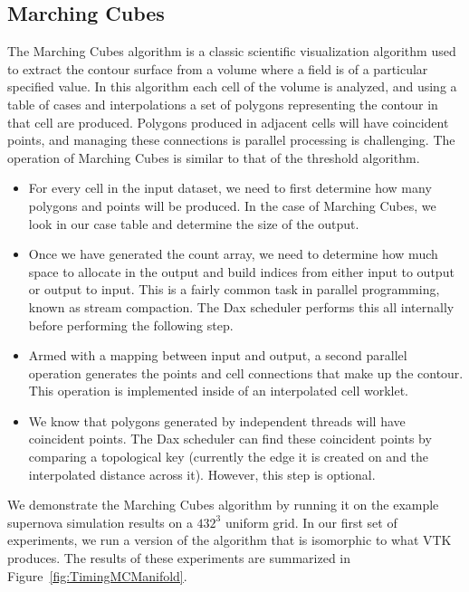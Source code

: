 \subsection{Marching Cubes}

The Marching Cubes algorithm is a classic scientific
visualization algorithm used to extract the contour surface from a volume
where a field is of a particular specified value. In this algorithm each
cell of the volume is analyzed, and using a table of cases and
interpolations a set of polygons representing the contour in that cell are
produced. Polygons produced in adjacent cells will have coincident points,
and managing these connections is parallel processing is challenging. The
operation of Marching Cubes is similar to that of the threshold algorithm.

\begin{itemize}
\item For every cell in the input dataset, we need to first determine how
  many polygons and points will be produced. In the case of Marching Cubes,
  we look in our case table and determine the size of the output.
\item Once we have generated the count array, we need to determine how much
  space to allocate in the output and build indices from either input to
  output or output to input. This is a fairly common task in parallel
  programming, known as stream compaction. The Dax scheduler performs this
  all internally before performing the following step.
\item Armed with a mapping between input and output, a second parallel
  operation generates the points and cell connections that make up the
  contour. This operation is implemented inside of an interpolated cell
  worklet.
\item We know that polygons generated by independent threads will have
  coincident points. The Dax scheduler can find these coincident points by
  comparing a topological key (currently the edge it is created on and the
  interpolated distance across it). However, this step is optional.
\end{itemize}

We demonstrate the Marching Cubes algorithm by running it on the example
supernova simulation results on a $432^3$ uniform grid. In our first set of
experiments, we run a version of the algorithm that is isomorphic to what
VTK produces. The results of these experiments are summarized in
Figure~\ref{fig:TimingMCManifold}.

